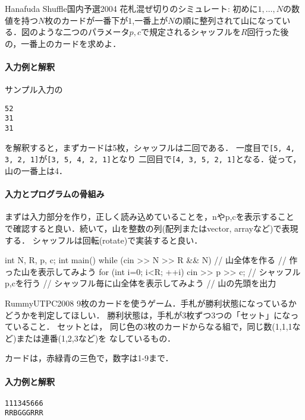 \begin{pbox}{Hanafuda Shuffle}{国内予選2004}
花札混ぜ切りのシミュレート: 初めに$1,\ldots,N$の数値を持つ$N$枚のカードが一番下が$1$,一番上が$N$の順に整列されて山になっている．図のような二つのパラメータ$p,c$で規定されるシャッフルを$R$回行った後の，一番上のカードを求めよ．

\end{pbox}

\paragraph{入力例と解釈}

サンプル入力の
\begin{alltt}
5 2
3 1
3 1
\end{alltt}
を解釈すると，まずカードは5枚，シャッフルは二回である．
一度目で\texttt{[5, 4, 3, 2, 1]}が\texttt{[3, 5, 4, 2, 1]}となり
二回目で\texttt{[4, 3, 5, 2, 1]}となる．従って，山の一番上は4．

\paragraph{入力とプログラムの骨組み}

まずは入力部分を作り，正しく読み込めていることを，nやp,cを表示すること
で確認すると良い．続いて，山を整数の列(配列またはvector, arrayなど)で表現する．
シャッフルは回転(rotate)で実装すると良い．

\begin{cbox}
int N, R, p, c;
int main() {
    while (cin >> N >> R && N) {
        // 山全体を作る
        // 作った山を表示してみよう
        for (int i=0; i<R; ++i) {
            cin >> p >> c;
            // シャッフルp,cを行う
            // シャッフル毎に山全体を表示してみよう
        }
        // 山の先頭を出力
    }
}
\end{cbox}



\begin{pbox}{Rummy}{UTPC2008}
9枚のカードを使うゲーム．手札が勝利状態になっているかどうかを判定してほしい．
勝利状態は，手札が3枚ずつ3つの「セット」になっていること． セットとは，
同じ色の3枚のカードからなる組で，同じ数(1,1,1など)または連番(1,2,3など)を
なしているもの．

カードは，赤緑青の三色で，数字は1-9まで．
  
\end{pbox}


\paragraph{入力例と解釈}
\begin{alltt}
1 1 1 3 4 5 6 6 6
R R B G G G R R R
\end{alltt}

